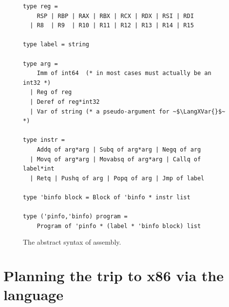 \documentclass[11pt]{book}
\newcommand{\ocaml}[1]{{\color{blue}{#1}}}
\begin{document}
\begin{figure}[tp]
\fbox{
\begin{minipage}{0.98\textwidth}
\small    
\[
\begin{array}{lcl}
\Reg &::=& \allregisters{} \\
\Arg &::=&  \IMM{\Int} \mid \REG{\Reg}
   \mid \DEREF{\Reg}{\Int} \\
\Instr &::=& \BININSTR{\code{addq}}{\Arg}{\Arg} 
       \mid \BININSTR{\code{subq}}{\Arg}{\Arg} \\
       &\mid& \UNIINSTR{\code{negq}}{\Arg}\\
       &\mid& \BININSTR{\code{movq}}{\Arg}{\Arg}
       \ocaml{\mid \BININSTR{\code{movabsq}}{\Arg}{\Arg}} \\
       &\mid& \CALLQ{\itm{label}}{\itm{int}} \mid \RETQ{} 
       \mid \PUSHQ{\Arg} \mid \POPQ{\Arg} \mid \JMP{\itm{label}} \\
\Block &::= & \BLOCK{\itm{info}}{\LP\Instr\ldots\RP} \\
\LangXInt{} &::= & \XPROGRAM{\itm{info}}{\LP\LP\itm{label} \,\key{.}\, \Block \RP\ldots\RP}
\end{array}
\]
\end{minipage}
}
\begin{lstlisting}[style=ocaml,frame=single]
type reg =
    RSP | RBP | RAX | RBX | RCX | RDX | RSI | RDI
  | R8  | R9  | R10 | R11 | R12 | R13 | R14 | R15

type label = string

type arg =
    Imm of int64  (* in most cases must actually be an int32 *)
  | Reg of reg
  | Deref of reg*int32
  | Var of string (* a pseudo-argument for ~$\LangXVar{}$~ *)

type instr =
    Addq of arg*arg | Subq of arg*arg | Negq of arg 
  | Movq of arg*arg | Movabsq of arg*arg | Callq of label*int 
  | Retq | Pushq of arg | Popq of arg | Jmp of label

type 'binfo block = Block of 'binfo * instr list

type ('pinfo,'binfo) program =
    Program of 'pinfo * (label * 'binfo block) list 
\end{lstlisting}
\caption{The abstract syntax of \LangXInt{} \ocaml{and \LangXVar{}} assembly.}
\label{fig:x86-int-ast}
\end{figure}


\section{Planning the trip to x86 via the \LangCVar{} language}
\label{sec:plan-s0-x86}
\end{document}
